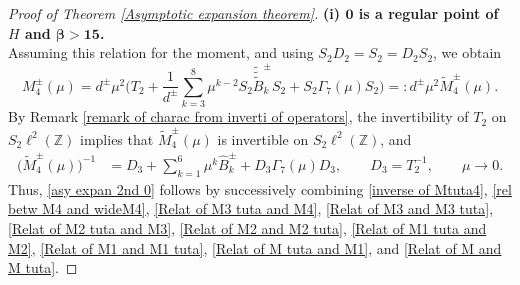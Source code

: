 \documentclass[10pt,a4paper]{amsart}
\newcommand\Z{\mathbb{Z}}
\numberwithin{equation}{section}
\begin{document}
\begin{proof}[Proof of Theorem {\rm\ref{Asymptotic expansion theorem}}]{\bf{(i) ${\bm{0}}$ is a regular point of $H$ and {$\bm{\beta>15}$}.}}
\begin{equation}
\end{equation}
Assuming this relation for the moment, and using $S_2D_2=S_2=D_2S_2$, we obtain
\begin{equation}\label{rel betw M4 and wideM4}
M^{\pm}_4(\mu)=d^{\pm}\mu^2\Big(T_2+\frac{1}{d^{\pm}}\sum\limits_{k=3}^{8}\mu^{k-2}S_2\tilde{\tilde{\tilde{B}}}^{\pm}_{k}S_2+S_2\Gamma_7(\mu)S_2\Big)=:d^{\pm}\mu^2\widetilde{M}^{\pm}_4(\mu).
\end{equation}
By Remark \ref{remark of charac from inverti of operators}, the invertibility of $T_2$ on $S_2\ell^2(\Z)$ implies that $\widetilde{M}^{\pm}_4(\mu)$ is invertible on $S_2\ell^2(\Z)$, and
\begin{align}\label{inverse of Mtuta4}
\big(\widetilde{M}_{4}^{\pm}(\mu)\big)^{-1}
&=D_3+\sum\limits_{k=1}^{6}\mu^k\hat{B}^{\pm}_{k}+D_3\Gamma_7(\mu)D_3,\qquad D_3=T^{-1}_2,\qquad \mu\rightarrow0.
\end{align}
Thus, \eqref{asy expan 2nd 0} follows by successively combining \eqref{inverse of Mtuta4}, \eqref{rel betw M4 and wideM4}, \eqref{Relat of M3 tuta and M4}, \eqref{Relat of M3 and M3 tuta}, \eqref{Relat of M2 tuta and M3}, \eqref{Relat of M2 and M2 tuta}, \eqref{Relat of M1 tuta and M2}, \eqref{Relat of M1 and M1 tuta}, \eqref{Relat of M tuta and M1}, and \eqref{Relat of M and M tuta}.


\end{proof}
\end{document}
